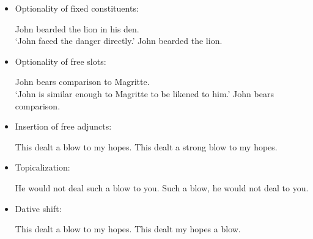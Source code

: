 \documentclass[output=paper]{langsci/langscibook}
\begin{document}
\begin{itemize}
\item Optionality of fixed constituents:

\begin{exe}
\ex \label{ex:6:23}
\begin{xlist}
\ex \label{ex:6:23a}
John bearded the lion in his den.\\
 ‘John faced the danger directly.’
\ex \label{ex:6:23b}
John bearded the lion.
\end{xlist}
\end{exe}	

\item Optionality of free slots:

\begin{exe}
\ex \label{ex:6:24}
\begin{xlist}
\ex \label{ex:6:24a}
John bears comparison to Magritte.\\
 ‘John is similar enough to Magritte to be likened to him.’
\ex \label{ex:6:24b}
John bears comparison.
\end{xlist}
\end{exe}
 
\item Insertion of free adjuncts: 


\begin{exe}
\ex \label{ex:6:25}
\begin{xlist}
\ex \label{ex:6:25a}
This dealt a blow to my hopes.
\ex \label{ex:6:25b}
This dealt a strong blow to my hopes.
\end{xlist}
\end{exe}
\item Topicalization: 

\begin{exe}
\ex \label{ex:6:26}
\begin{xlist}
\ex \label{ex:6:26a}
He would not deal such a blow to you.
\ex \label{ex:6:26b}
Such a blow, he would not deal to you.
\end{xlist}
\end{exe}

\item Dative shift: 

\begin{exe}
\ex \label{ex:6:27}
\begin{xlist}
\ex \label{ex:6:27a}
This dealt a blow to my hopes.
\ex \label{ex:6:27b}
This dealt my hopes a blow.
\end{xlist}
\end{exe}


\end{itemize}
\end{document}
